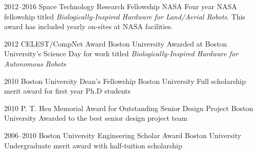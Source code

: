 \documentclass[print]{friggeri-cv} %
\begin{document}
\begin{entrylist}


\entry
{2012--2016}
{Space Technology Research Fellowship}
{NASA}
{Four year NASA fellowship titled \emph{Biologically-Inspired Hardware for Land/Aerial Robots}. This award has included yearly on-sites at NASA facilities.}

\entry
{2012}
{CELEST/CompNet Award}
{Boston University}
{Awarded at Boston University's Science Day for work titled \emph{Biologically-Inspired Hardware for Autonomous Robots}}

\entry
{2010}
{Boston University Dean's Fellowship}
{Boston University}
{Full scholarship merit award for first year Ph.D students}

\entry
{2010}
{P. T. Hsu Memorial Award for Outstanding Senior Design Project}
{Boston University}
{Awarded to the best senior design project team}

\entry
{2006--2010}
{Boston University Engineering Scholar Award}
{Boston University}
{Undergraduate merit award with half-tuition scholarship}


\end{entrylist}




\end{document}
